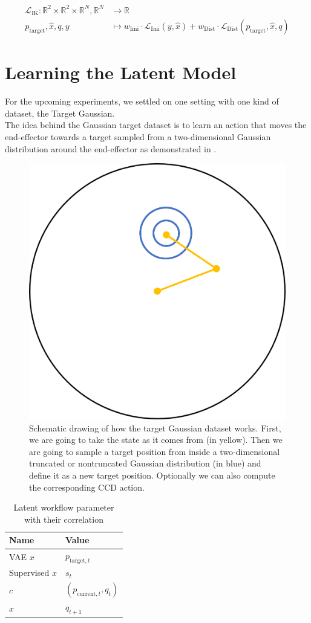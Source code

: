 \begin{equation}\label{eqn:IK-Loss}
    \begin{split}
        \mathcal{L}_\text{IK}: \mathbb{R}^2 \times \mathbb{R}^2 \times \mathbb{R}^N, \mathbb{R}^N & \to \mathbb{R} \\
        p_\text{target}, \hat{x}, q, y  &\mapsto w_\text{Imi} \cdot \mathcal{L}_\text{Imi}(y, \hat{x}) + w_\text{Dist} \cdot \mathcal{L}_\text{Dist}(p_\text{target}, \hat{x}, q)
    \end{split}
\end{equation}

\section{Learning the Latent Model}

For the upcoming experiments, we settled on one setting with one kind of dataset, the Target Gaussian. \\
The idea behind the Gaussian target dataset is to learn an action that moves the end-effector towards a target sampled from a two-dimensional Gaussian distribution around the end-effector as demonstrated in .
\begin{figure}
    \begin{center}
        \includegraphics[width=0.3 \linewidth]{figures/experiments/VAE/TargetGaussian.png}
    \end{center}
    \caption[Target Gaussian Schematics]{Schematic drawing of how the target Gaussian dataset works. First, we are going to take the state as it comes from  (in yellow). Then we are going to sample a target position from inside a two-dimensional truncated or nontruncated Gaussian distribution (in blue) and define it as a new target position. Optionally we can also compute the corresponding CCD action.}\label{fig:TargetGaussian_Schematics}
\end{figure}

\begin{table}[]
    \centering
    \begin{tabular}{l|l}
        Name & Value \\
        \hline
        VAE $x$ & $p_{\text{target}, t}$ \\
        Supervised $x$ & $s_t$ \\
        $c$ & $(p_{\text{current}, t}, q_t)$ \\
        $\hat{x}$ & $q_{t + 1}$
    \end{tabular}
    \caption[Latent workflow parameter]{Latent workflow parameter with their correlation}
    \label{tab:Latent Parameter}
\end{table}

